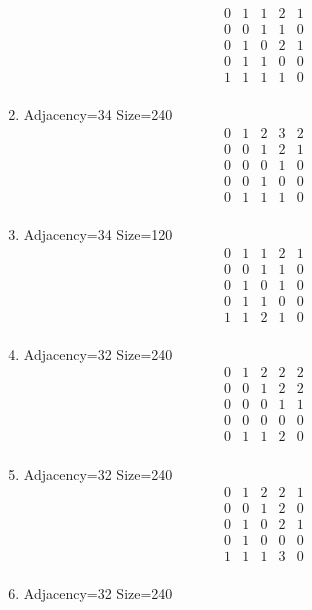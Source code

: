 \documentclass[12pt]{article}
\begin{document}
\begin{multicols}{3}
\begin{enumerate}
\begin{equation*}
\begin{array}{ccccc}
0&1&1&2&1\\
0&0&1&1&0\\
0&1&0&2&1\\
0&1&1&0&0\\
1&1&1&1&0\\
\end{array}
\end{equation*}
\item Adjacency=34 Size=240
\begin{equation*}
\begin{array}{ccccc}
0&1&2&3&2\\
0&0&1&2&1\\
0&0&0&1&0\\
0&0&1&0&0\\
0&1&1&1&0\\
\end{array}
\end{equation*}
\item Adjacency=34 Size=120
\begin{equation*}
\begin{array}{ccccc}
0&1&1&2&1\\
0&0&1&1&0\\
0&1&0&1&0\\
0&1&1&0&0\\
1&1&2&1&0\\
\end{array}
\end{equation*}
\item Adjacency=32 Size=240
\begin{equation*}
\begin{array}{ccccc}
0&1&2&2&2\\
0&0&1&2&2\\
0&0&0&1&1\\
0&0&0&0&0\\
0&1&1&2&0\\
\end{array}
\end{equation*}
\item Adjacency=32 Size=240
\begin{equation*}
\begin{array}{ccccc}
0&1&2&2&1\\
0&0&1&2&0\\
0&1&0&2&1\\
0&1&0&0&0\\
1&1&1&3&0\\
\end{array}
\end{equation*}
\item Adjacency=32 Size=240

\end{enumerate}
\end{multicols}
\end{document}
